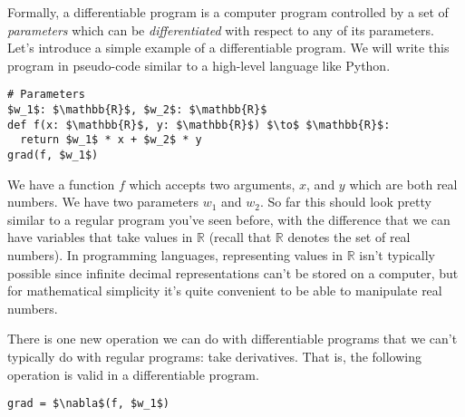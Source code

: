 \documentclass[book.tex]{subfiles}
\begin{document}

Formally, a differentiable program is a computer program controlled by a set of \textit{parameters} which can be \textit{differentiated} with respect to any of its parameters. Let's introduce a simple example of a differentiable program. We will write this program in pseudo-code similar to a high-level language like Python.

\begin{lstlisting}
# Parameters
$w_1$: $\mathbb{R}$, $w_2$: $\mathbb{R}$
def f(x: $\mathbb{R}$, y: $\mathbb{R}$) $\to$ $\mathbb{R}$:
  return $w_1$ * x + $w_2$ * y
grad(f, $w_1$)
\end{lstlisting}

We have a function $f$ which accepts two arguments, $x$, and $y$ which are both real numbers. We have two parameters $w_1$ and $w_2$. So far this should look pretty similar to a regular program you've seen before, with the difference that we can have variables that take values in $\mathbb{R}$ (recall that $\mathbb{R}$ denotes the set of real numbers). In programming languages, representing values in $\mathbb{R}$ isn't typically possible since infinite decimal representations can't be stored on a computer, but for mathematical simplicity it's quite convenient to be able to manipulate real numbers.

There is one new operation we can do with differentiable programs that we can't typically do with regular programs: take derivatives. That is, the following operation is valid in a differentiable program.

\begin{lstlisting}
grad = $\nabla$(f, $w_1$)
\end{lstlisting}
\end{document}
